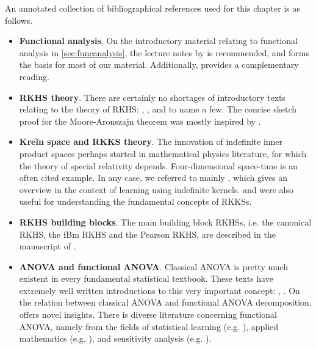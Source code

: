 \documentclass[showframe,11pt]{report}
\begin{document}
An annotated collection of bibliographical references used for this chapter is as follows.
\begin{itemize}
  \item \textbf{Functional analysis}. 
  On the introductory material relating to functional analysis in \cref{sec:funcanalysis}, the lecture notes by \citet{sejdinovic2012} is recommended, and forms the basis for most of our material. 
  Additionally, \citet{rudin1987real,yamamoto2012vector,kokoszka2017introduction} provides a complementary reading.
  \item \textbf{RKHS theory}. 
  There are certainly no shortages of introductory texts relating to the theory of RKHS: \citet{steinwart2008support}, \citet{berlinet2011reproducing}, and \citet{gu2013smoothing} to name a few. 
  The concise sketch proof for the Moore-Aronszajn theorem was mostly inspired by \citet[Theorem 4]{hein2004kernels}.
  \item \textbf{Kreĭn space and RKKS theory}. 
  The innovation of indefinite inner product spaces perhaps started in mathematical physics literature, for which the theory of special relativity depends. 
  Four-dimensional space-time is an often cited example. 
  In any case, we referred to mainly \citet{ong2004learning}, which gives an overview in the context of learning using indefinite kernels. 
  \citet{alpay1991some} and \citet{zafeiriou2012subspace} were also useful for understanding the fundamental concepts of RKKSs.
  \item \textbf{RKHS building blocks}. 
  The main building block RKHSs, i.e. the canonical RKHS, the fBm RKHS and the Pearson RKHS, are described in the manuscript of \citet{bergsma2017}.
  \item \textbf{ANOVA and functional ANOVA}. 
  Classical ANOVA is pretty much existent in every fundamental statistical textbook. These texts have extremely well written introductions to this very important concept: \citet[Ch. 11]{casella2002statistical}, \citet[Ch. 3]{dean1999design}. 
  On the relation between classical ANOVA and functional ANOVA decomposition, \citet{gu2013smoothing} offers novel insights. There is diverse literature concerning functional ANOVA, namely from the fields of statistical learning (e.g. \cite{wahba1990spline}), applied mathematics (e.g. \cite{kuo2010decompositions}), and sensitivity analysis (e.g. \cite{sobol2001global,durrande2013anova}). 
\end{itemize}


\hClosingStuffStandalone
\end{document}
